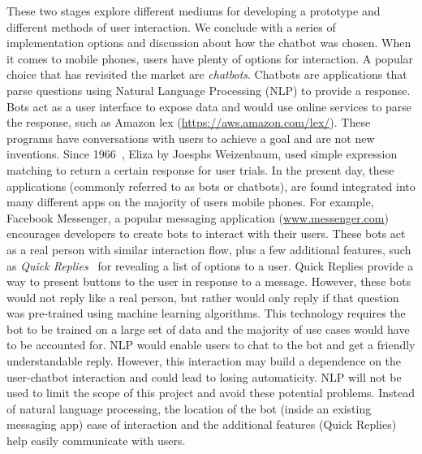 These two stages explore different mediums for developing a prototype and different methods of user interaction. We conclude with a series of implementation options and discussion about how the chatbot was chosen.\newline
\newline
When it comes to mobile phones, users have plenty of options for interaction. A popular choice that has revisited the market are \textit{chatbots}. Chatbots are applications that parse questions using Natural Language Processing (NLP) to provide a response. Bots act as a user interface to expose data and would use online services to parse the response, such as Amazon lex (\url{https://aws.amazon.com/lex/}). These programs have conversations with users to achieve a goal and are not new inventions. Since 1966~\cite{article_eliza}, Eliza by Joesphs Weizenbaum, used simple expression matching to return a certain response for user trials. In the present day, these applications (commonly referred to as bots or chatbots), are found integrated into many different apps on the majority of users mobile phones. For example, Facebook Messenger, a popular messaging application (\url{www.messenger.com}) encourages developers to create bots to interact with their users. These bots act as a real person with similar interaction flow, plus a few additional features, such as \textit{Quick Replies}~\cite{doc_fb_quick_replies} for revealing a list of options to a user. Quick Replies provide a way to present buttons to the user in response to a message. However, these bots would not reply like a real person, but rather would only reply if that question was pre-trained using machine learning algorithms. This technology requires the bot to be trained on a large set of data and the majority of use cases would have to be accounted for.
NLP would enable users to chat to the bot and get a friendly understandable reply. However, this interaction may build a dependence on the user-chatbot interaction and could lead to losing automaticity. NLP will not be used to limit the scope of this project and avoid these potential problems.
Instead of natural language processing, the location of the bot (inside an existing messaging app) ease of interaction and the additional features (Quick Replies) help easily communicate with users.


